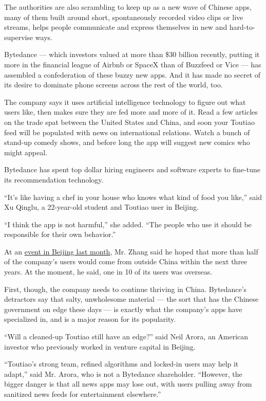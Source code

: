 The authorities are also scrambling to keep up as a new wave of Chinese
apps, many of them built around short, spontaneously recorded video
clips or live streams, helps people communicate and express themselves
in new and hard-to-supervise ways.

Bytedance --- which investors valued at more than \$30 billion recently,
putting it more in the financial league of Airbnb or SpaceX than of
Buzzfeed or Vice --- has assembled a confederation of these buzzy new
apps. And it has made no secret of its desire to dominate phone screens
across the rest of the world, too.

The company says it uses artificial intelligence technology to figure
out what users like, then makes sure they are fed more and more of it.
Read a few articles on the trade spat between the United States and
China, and soon your Toutiao feed will be populated with news on
international relations. Watch a bunch of stand-up comedy shows, and
before long the app will suggest new comics who might appeal.

Bytedance has spent top dollar hiring engineers and software experts to
fine-tune its recommendation technology.

``It's like having a chef in your house who knows what kind of food you
like,'' said Xu Qinglu, a 22-year-old student and Toutiao user in
Beijing.

``I think the app is not harmful,'' she added. ``The people who use it
should be responsible for their own behavior.''

At an \href{http://36kr.com/p/5125610.html}{event in Beijing last
month}, Mr. Zhang said he hoped that more than half of the company's
users would come from outside China within the next three years. At the
moment, he said, one in 10 of its users was overseas.

First, though, the company needs to continue thriving in China.
Bytedance's detractors say that salty, unwholesome material --- the sort
that has the Chinese government on edge these days --- is exactly what
the company's apps have specialized in, and is a major reason for its
popularity.

``Will a cleaned-up Toutiao still have an edge?'' said Neil Arora, an
American investor who previously worked in venture capital in Beijing.

``Toutiao's strong team, refined algorithms and locked-in users may help
it adapt,'' said Mr. Arora, who is not a Bytedance shareholder.
``However, the bigger danger is that all news apps may lose out, with
users pulling away from sanitized news feeds for entertainment
elsewhere.''

